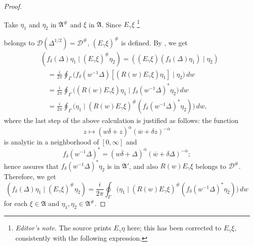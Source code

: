 \documentclass[12pt,b5paper,twoside]{article}
\theoremstyle{takesaki}
\numberwithin{equation}{section}
\newcounter{editorialnote}
\newcommand{\ednote}[1]{%
  \stepcounter{editorialnote}%
  \begingroup
  \renewcommand{\thefootnote}{E\arabic{editorialnote}}%
  \footnote{\textit{Editor's note.} #1}%
  \addtocounter{footnote}{-1}%
  \endgroup
}
\begin{document}
\begin{proof}
\begin{center}
\end{center}

Take $\eta_1$ and $\eta_2$ in $\mathfrak A^{\#}$ and $\xi$ in
$\mathfrak A$.  Since $E_\gamma\xi$\ednote{The source prints
$E_\gamma\eta$ here; this has been corrected to $E_\gamma\xi$, consistently
with the following expression.} belongs to
$\mathcal D(\Delta^{1/2})=\mathcal D^{\#}$,
$(E_\gamma\xi)^{\#}$ is defined.  By , we get
\begin{align*}
 &(f_\delta(\Delta)\eta_1\mid(E_\gamma\xi)^{\#}\eta_2)
   =((E_\gamma\xi)(f_\delta(\Delta)\eta_1)\mid\eta_2)\\
 &\quad=\frac{i}{2\pi}\oint_\Gamma
   \bigl(f_\delta(w^{-1}\Delta)[(R(w)E_\gamma\xi)\eta_1]
   \mid\eta_2\bigr)\,dw\\
 &\quad=\frac{i}{2\pi}\oint_\Gamma
   \bigl((R(w)E_\gamma\xi)\eta_1
   \mid f_\delta(w^{-1}\Delta)^*\eta_2\bigr)\,dw\\
 &\quad=\frac{i}{2\pi}\oint_\Gamma
   \bigl(\eta_1\mid(R(w)E_\gamma\xi)^{\#}
   (f_\delta(w^{-1}\Delta)^*\eta_2)\bigr)\,dw,
\end{align*}
where the last step of the above calculation is justified as follows:
the function
\[
 z\longmapsto(w\overline\delta+z)^{\overline\alpha}
 (\overline w+\delta z)^{-\overline\alpha}
\]
is analytic in a neighborhood of $[0,\infty]$ and
\[
 f_\delta(w^{-1}\Delta)^*
 =(w\overline\delta+\Delta)^{\overline\alpha}
  (\overline w+\delta\Delta)^{-\overline\alpha};
\]
hence  assures that
$f_\delta(w^{-1}\Delta)^*\eta_2$ is in $\mathfrak A'$, and also
$R(w)E_\gamma\xi$ belongs to $\mathcal D^{\#}$.  Therefore, we get
\begin{equation}
 (f_\delta(\Delta)\eta_1\mid(E_\gamma\xi)^{\#}\eta_2)
 =\frac{i}{2\pi}\oint_\Gamma
 \bigl(\eta_1\mid(R(w)E_\gamma\xi)^{\#}
 (f_\delta(w^{-1}\Delta)^*\eta_2)\bigr)\,dw
 \tag{9.4}\label{eq:9.4}
\end{equation}
for each $\xi\in\mathfrak A$ and
$\eta_1,\eta_2\in\mathfrak A^{\#}$.


\end{proof}
\end{document}
